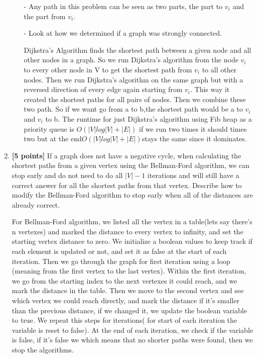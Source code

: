 \documentclass[11pt]{article}
\begin{document}
\begin{enumerate}
\begin{itemize}
\item[-] Any path in this problem can be seen as two parts, the part to $v_i$ and the part from $v_i$.
\item[-] Look at how we determined if a graph was strongly connected.

\begin{enumerate}
Dijkstra's Algorithm finds the shortest path between a given node and all other nodes in a graph. So we run Dijkstra's algorithm from the node  $v_i $ to every other node in V to get the shortest path from  $v_i $  to all other nodes. Then we run Dijkstra's algorithm on the same graph but with a reversed direction of every edge again  starting from $v_i $. This way it created the shortest paths for all pairs of nodes. Then we combine these two path. So if we want go from a to b,the shortest path would be a to  $v_i $  and  $v_i $  to b. The runtime for just  Dijkstra's algorithm using Fib heap as a priority queue is $O(|V| log |V| + |E|)$  if we run two times it should times two but at the end$ O(|V| log |V| + |E|) $stays the same since it dominates. 

\end{enumerate}


\end{itemize}

\item \textbf{[5 points]} If a graph does not have a negative cycle, when calculating the shortest paths from a given vertex using the Bellman-Ford algorithm, we can stop early and do not need to do all $|V|-1$ iterations and will still have a correct answer for all the shortest paths from that vertex.  Describe how to modify the Bellman-Ford algorithm to stop early when all of the distances are already correct.

For Bellman-Ford algorithm, we listed all the vertex in a table(lets say there's n vertexes) and marked the distance to every vertex to infinity,  and set the starting vertex distance to zero. We initialize a boolean values to keep track if each element is updated or not, and set it as false at the start of each iteration. Then we go through the graph for first iteration using a loop (meaning from the first vertex to the last vertex). Within the first iteration, we go from the starting index to the next vertexes it could reach, and we mark the distance in the table. Then we move to the second vertex and see which vertex we could reach directly, and mark the distance if it's smaller than the previous distance, if we changed it, we update the boolean variable to true.  We repeat this steps for iterations( for start of  each iteration the variable is reset to false). At the end of each iteration, we check if the variable is false, if it's false we which means that no shorter paths were found, then we stop the algorithms.




\end{enumerate}
\end{document}
